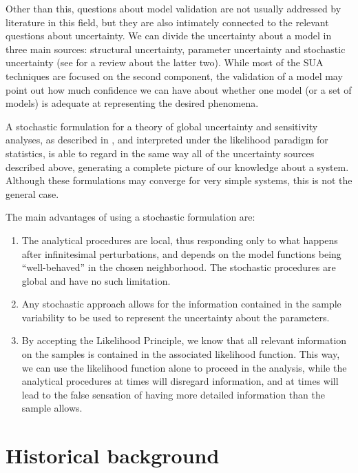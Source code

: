 \documentclass[twoside,12pt,a4paper]{article}
\begin{document}
Other than this, questions about model validation are not usually addressed by literature in this field,
but they are also intimately connected to the relevant questions about uncertainty. We can
divide the uncertainty about a model in three main sources: structural uncertainty, parameter uncertainty
and stochastic uncertainty (see \citep{Marino08} for a review about the latter two). While most
of the SUA techniques are focused on the second component, the validation of a model may point out
how much confidence we can have about whether one model (or a set of models) is adequate at
representing the desired phenomena.

A stochastic formulation for a theory of global uncertainty and sensitivity analyses, as described in 
\citep{Chalom12}, and interpreted under the likelihood paradigm for statistics, is able to regard
in the same way all of the uncertainty sources described above, generating a complete picture of our
knowledge about a system. Although these formulations may converge for very simple systems, this is not
the general case. 

The main advantages of using a stochastic formulation are:

\begin{enumerate}
  \item The analytical procedures are local, thus responding only to what happens after infinitesimal
    perturbations, and depends on the model functions being ``well-behaved'' in the chosen neighborhood.
    The stochastic procedures are global and have no such limitation.
  \item Any stochastic approach allows for the information contained in the sample variability to be used
    to represent the uncertainty about the parameters.
  \item By accepting the Likelihood Principle, we know that all relevant information on the samples is
    contained in the associated likelihood function. This way, we can use the likelihood function alone
    to proceed in the analysis, while the analytical procedures at times will disregard information, and
    at times will lead to the false sensation of having more detailed information than the sample allows.
\end{enumerate}

\section{Historical background}\label{sec:likelihood}
\end{document}
